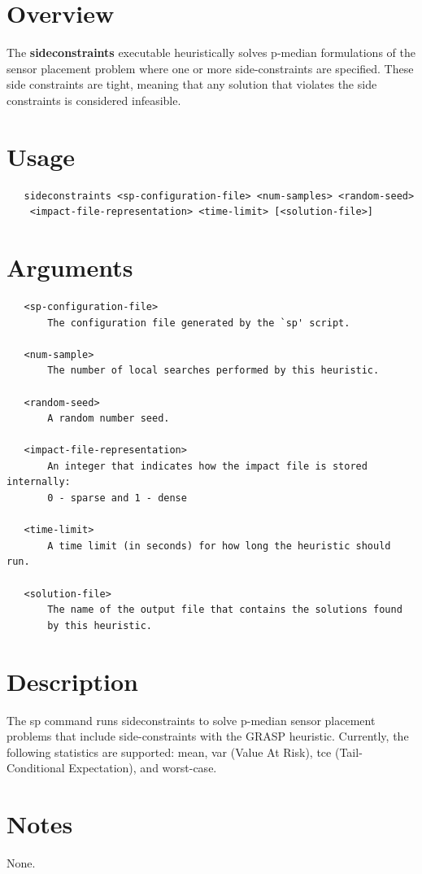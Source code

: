 \section{Overview}\label{sideconstraintsExecutable_sideconstraintsOverview}

The {\bfseries sideconstraints} executable heuristically solves p-\/median formulations of the sensor placement problem where one or more side-\/constraints are specified. These side constraints are tight, meaning that any solution that violates the side constraints is considered infeasible.

\section{Usage}\label{sideconstraintsExecutable_sideconstraintsUsage}

\begin{verbatim}
   sideconstraints <sp-configuration-file> <num-samples> <random-seed> 
	<impact-file-representation> <time-limit> [<solution-file>]
\end{verbatim}

\section{Arguments}\label{sideconstraintsExecutable_sideconstraintsArgs}

\begin{verbatim}
   <sp-configuration-file>
	   The configuration file generated by the `sp' script.

   <num-sample>
	   The number of local searches performed by this heuristic.

   <random-seed>
	   A random number seed.

   <impact-file-representation>
	   An integer that indicates how the impact file is stored internally:
	   0 - sparse and 1 - dense

   <time-limit>
	   A time limit (in seconds) for how long the heuristic should run.

   <solution-file>
	   The name of the output file that contains the solutions found
	   by this heuristic.
\end{verbatim}

\section{Description}\label{sideconstraintsExecutable_sideconstraintsDescription}

The {\ttfamily sp} command runs {\ttfamily sideconstraints} to solve p-\/median sensor placement problems that include side-\/constraints with the GRASP heuristic. Currently, the following statistics are supported: mean, var (Value At Risk), tce (Tail-\/Conditional Expectation), and worst-\/case.

\section{Notes}\label{sideconstraintsExecutable_sideconstraintsNotes}

None. 

